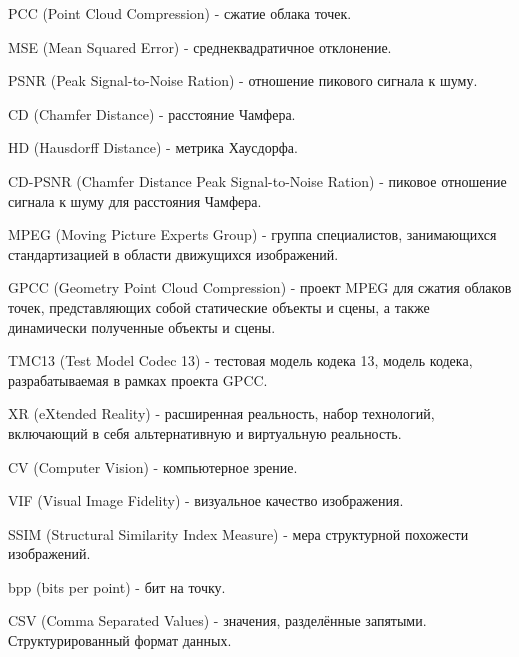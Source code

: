 PCC (Point Cloud Compression) - сжатие облака точек.

MSE (Mean Squared Error) - среднеквадратичное отклонение.

PSNR (Peak Signal-to-Noise Ration) - отношение пикового сигнала к шуму.

CD (Chamfer Distance) - расстояние Чамфера.

HD (Hausdorff Distance) - метрика Хаусдорфа.

CD-PSNR (Chamfer Distance Peak Signal-to-Noise Ration) - пиковое отношение
сигнала к шуму для расстояния Чамфера.

MPEG (Moving Picture Experts Group) - группа специалистов, занимающихся
стандартизацией в области движущихся изображений.

GPCC (Geometry Point Cloud Compression) - проект MPEG для сжатия облаков точек,
представляющих собой статические объекты и сцены, а также динамически полученные
объекты и сцены.

TMC13 (Test Model Codec 13) - тестовая модель кодека 13, модель кодека,
разрабатываемая в рамках проекта GPCC.

XR (eXtended Reality) - расширенная реальность, набор технологий, включающий в
себя альтернативную и виртуальную реальность.

CV (Computer Vision) - компьютерное зрение.

VIF (Visual Image Fidelity) - визуальное качество изображения.

SSIM (Structural Similarity Index Measure) - мера структурной похожести изображений.

bpp (bits per point) - бит на точку.

CSV (Comma Separated Values) - значения, разделённые запятыми. Структурированный
формат данных.
